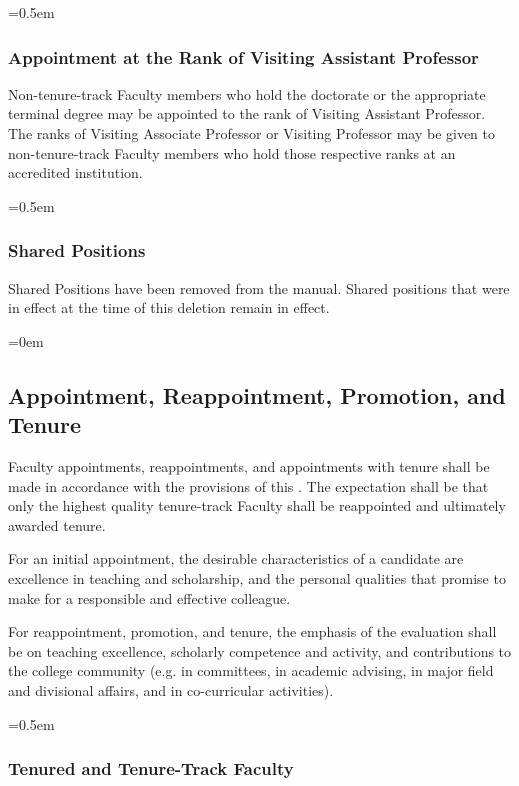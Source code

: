 \documentclass{manual}
\let\oldsubsection\subsection
\renewcommand\subsection{\leftskip=0em\oldsubsection}
\let\oldsubsubsection\subsubsection
\renewcommand\subsubsection{\leftskip=0.5em\oldsubsubsection}
\begin{document}
\subsubsection{Appointment at the Rank of Visiting Assistant Professor}\label{par:AppointmentAtTheRankOfVisitingProfessor}
Non-tenure-track Faculty members who hold the doctorate or the appropriate terminal degree may be appointed to the rank of Visiting Assistant Professor. The ranks of Visiting Associate Professor or Visiting Professor may be given to non-tenure-track Faculty members who hold those respective ranks at an accredited institution.

\subsubsection{Shared Positions}
Shared Positions have been removed from the manual. Shared positions that were in effect at the time of this deletion remain in effect.


\subsection{Appointment, Reappointment, Promotion, and Tenure}\label{sec:AppointmentReappointmentPromotionAndTenure}
Faculty appointments, reappointments, and appointments with tenure shall be made in accordance with the provisions of this . The expectation shall be that only the highest quality tenure-track Faculty shall be reappointed and ultimately awarded tenure.

For an initial appointment, the desirable characteristics of a candidate are excellence in teaching and scholarship, and the personal qualities that promise to make for a responsible and effective colleague.

For reappointment, promotion, and tenure, the emphasis of the evaluation shall be on teaching excellence, scholarly competence and activity, and contributions to the college community (e.g. in committees, in academic advising, in major field and divisional affairs, and in co-curricular activities).

\subsubsection{Tenured and Tenure-Track Faculty}\label{sub:TenuredAndTenureTrackFaculty}
\end{document}
